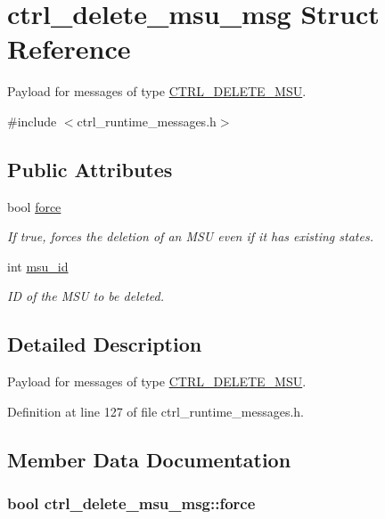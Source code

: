\hypertarget{structctrl__delete__msu__msg}{\section{ctrl\-\_\-delete\-\_\-msu\-\_\-msg Struct Reference}
\label{structctrl__delete__msu__msg}
}


Payload for messages of type \hyperlink{ctrl__runtime__messages_8h_aff250b7918a6975b13277c84bc6ec5b9abb237dc0ea60528dd97f4aab37fc9723}{C\-T\-R\-L\-\_\-\-D\-E\-L\-E\-T\-E\-\_\-\-M\-S\-U}.  




{\ttfamily \#include $<$ctrl\-\_\-runtime\-\_\-messages.\-h$>$}

\subsection*{Public Attributes}
\begin{DoxyCompactItemize}
\item 
bool \hyperlink{structctrl__delete__msu__msg_aee24e0a08448f45d22f4565a7dc7dfde}{force}
\begin{DoxyCompactList}\small\item\em If {\ttfamily true}, forces the deletion of an M\-S\-U even if it has existing states. \end{DoxyCompactList}\item 
int \hyperlink{structctrl__delete__msu__msg_a1ae44491d0840269eeec01757753fcb6}{msu\-\_\-id}
\begin{DoxyCompactList}\small\item\em I\-D of the M\-S\-U to be deleted. \end{DoxyCompactList}\end{DoxyCompactItemize}


\subsection{Detailed Description}
Payload for messages of type \hyperlink{ctrl__runtime__messages_8h_aff250b7918a6975b13277c84bc6ec5b9abb237dc0ea60528dd97f4aab37fc9723}{C\-T\-R\-L\-\_\-\-D\-E\-L\-E\-T\-E\-\_\-\-M\-S\-U}. 

Definition at line 127 of file ctrl\-\_\-runtime\-\_\-messages.\-h.



\subsection{Member Data Documentation}
\hypertarget{structctrl__delete__msu__msg_aee24e0a08448f45d22f4565a7dc7dfde}{
\subsubsection[{force}]{\setlength{\rightskip}{0pt plus 5cm}bool ctrl\-\_\-delete\-\_\-msu\-\_\-msg\-::force}}\label{structctrl__delete__msu__msg_aee24e0a08448f45d22f4565a7dc7dfde}


